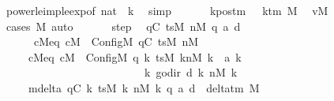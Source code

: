 \begin{isabellebody}
\ power{\isacharunderscore}{\kern0pt}le{\isacharunderscore}{\kern0pt}imp{\isacharunderscore}{\kern0pt}le{\isacharunderscore}{\kern0pt}exp{\isacharbrackleft}{\kern0pt}of\ {\isachardoublequoteopen}{}{\isacharcolon}{\kern0pt}{\isacharcolon}{\kern0pt}nat{\isachardoublequoteclose}\ {}\ {\isacharquery}{\kern0pt}k{\isacharbrackright}{\kern0pt}\ \isamarkupfalse%
\ simp\isanewline
\ \ \isamarkupfalse%
\isanewline
\ \ \isamarkupfalse%
\ kpos{\isacharunderscore}{\kern0pt}tm{\isacharcolon}{\kern0pt}\ {\isachardoublequoteopen}{}\ {\isacharless}{\kern0pt}\ k{\isacharunderscore}{\kern0pt}tm\ M{\isachardoublequoteclose}\ \isamarkupfalse%
\ vM\ \isamarkupfalse%
\ {\isacharparenleft}{\kern0pt}cases\ M{\isacharparenright}{\kern0pt}\ auto\isanewline
\ \ %
\isanewline
\ \ \isamarkupfalse%
\ step\ \isamarkupfalse%
\ qC\ tsM\ nM\ q{\isacharprime}{\kern0pt}\ a{\isacharprime}{\kern0pt}\ d\ \isanewline
\ \ \ \ \ \ cM{\isacharunderscore}{\kern0pt}eq{\isacharcolon}{\kern0pt}\ {\isachardoublequoteopen}cM\ {\isacharequal}{\kern0pt}\ Config\isactrlsub M\ qC\ tsM\ nM{\isachardoublequoteclose}\isanewline
\ \ \ \ \ cM{}{\isacharunderscore}{\kern0pt}eq{\isacharcolon}{\kern0pt}\ {\isachardoublequoteopen}cM{\isacharunderscore}{\kern0pt}{}\ {\isacharequal}{\kern0pt}\ Config\isactrlsub M\ q{\isacharprime}{\kern0pt}\ {\isacharparenleft}{\kern0pt}{\isasymlambda}k{\isachardot}{\kern0pt}\ {\isacharparenleft}{\kern0pt}tsM\ k{\isacharparenright}{\kern0pt}{\isacharparenleft}{\kern0pt}nM\ k\ {\isacharcolon}{\kern0pt}{\isacharequal}{\kern0pt}\ a{\isacharprime}{\kern0pt}\ k{\isacharparenright}{\kern0pt}{\isacharparenright}{\kern0pt}\isanewline
\ \ \ \ \ \ \ \ \ \ \ \ \ \ \ \ \ \ \ \ \ \ \ \ \ \ {\isacharparenleft}{\kern0pt}{\isasymlambda}k{\isachardot}{\kern0pt}\ go{\isacharunderscore}{\kern0pt}dir\ {\isacharparenleft}{\kern0pt}d\ k{\isacharparenright}{\kern0pt}\ {\isacharparenleft}{\kern0pt}nM\ k{\isacharparenright}{\kern0pt}{\isacharparenright}{\kern0pt}{\isachardoublequoteclose}\isanewline
\ \ \ \ \ mdelta{\isacharcolon}{\kern0pt}\ {\isachardoublequoteopen}{\isacharparenleft}{\kern0pt}qC{\isacharcomma}{\kern0pt}\ {\isasymlambda}k{\isachardot}{\kern0pt}\ tsM\ k\ {\isacharparenleft}{\kern0pt}nM\ k{\isacharparenright}{\kern0pt}{\isacharcomma}{\kern0pt}\ q{\isacharprime}{\kern0pt}{\isacharcomma}{\kern0pt}\ a{\isacharprime}{\kern0pt}{\isacharcomma}{\kern0pt}\ d{\isacharparenright}{\kern0pt}\ {\isasymin}\ delta{\isacharunderscore}{\kern0pt}tm\ M{\isachardoublequoteclose}\isanewline

\end{isabellebody}
